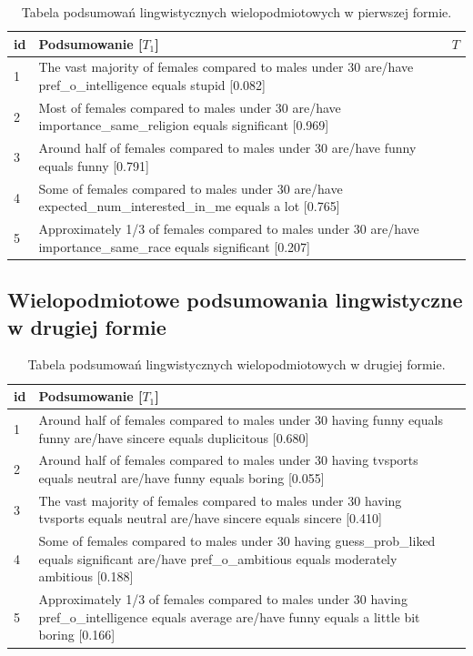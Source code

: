 \documentclass{classrep}
\begin{document}
\begin{center}
  \begin{table}[H]
    \begin{tabularx}{\textwidth}{lXc}
    
    id & Podsumowanie [$T_1$] & $T$ \\ \hline 
  
    1 & The vast majority of females compared to males under 30 are/have pref\_o\_intelligence equals stupid [0.082] \\\hline
    2 & Most of females compared to males under 30 are/have importance\_same\_religion equals significant [0.969] \\  \hline
    3 & Around half of females compared to males under 30 are/have funny equals funny [0.791] \\ \hline
    4 & Some of females compared to males under 30 are/have expected\_num\_interested\_in\_me equals a lot [0.765]\\ \hline
    5 & Approximately 1/3 of females compared to males under 30 are/have importance\_same\_race equals significant [0.207] \\ \hline
  \end{tabularx}
  \caption{Tabela podsumowań lingwistycznych wielopodmiotowych w pierwszej formie.}
\end{table}
\end{center}

\subsection{Wielopodmiotowe podsumowania lingwistyczne w drugiej formie}

\begin{center}
  \begin{table}[H]
    \begin{tabularx}{\textwidth}{lXc}
    
    id & Podsumowanie [$T_1$]\\ \hline 
  
    1 & Around half of females compared to males under 30 having funny equals funny are/have sincere equals duplicitous [0.680] \\\hline
    2 & Around half of females compared to males under 30 having tvsports equals neutral are/have funny equals boring [0.055]\\  \hline
    3 & The vast majority of females compared to males under 30 having tvsports equals neutral are/have sincere equals sincere [0.410] \\ \hline
    4 & Some of females compared to males under 30 having guess\_prob\_liked equals significant are/have pref\_o\_ambitious equals moderately ambitious [0.188]\\ \hline
    5 & Approximately 1/3 of females compared to males under 30 having pref\_o\_intelligence equals average are/have funny equals a little bit boring [0.166]\\ \hline
  \end{tabularx}
  \caption{Tabela podsumowań lingwistycznych wielopodmiotowych w drugiej formie.}
\end{table}
\end{center}
\end{document}
